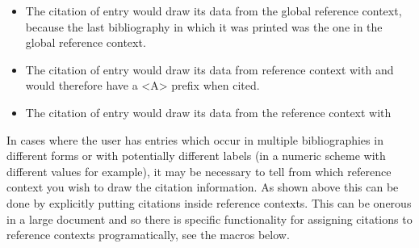 \begin{itemize}
\item The citation of entry  would draw its data from the global reference context, because the last bibliography in which it was printed was the one in the global reference context.
\item The citation of entry  would draw its data from reference context with  and would therefore have a <A> prefix when cited.
\item The citation of entry  would draw its data from the reference context with 
\end{itemize}
%
In cases where the user has entries which occur in multiple bibliographies in different forms or with potentially different labels (in a numeric scheme with different  values for example), it may be necessary to tell \biblatex from which reference context you wish to draw the citation information. As shown above this can be done by explicitly putting citations inside reference contexts. This can be onerous in a large document and so there is specific functionality for assigning citations to reference contexts programatically, see the  macros below.

